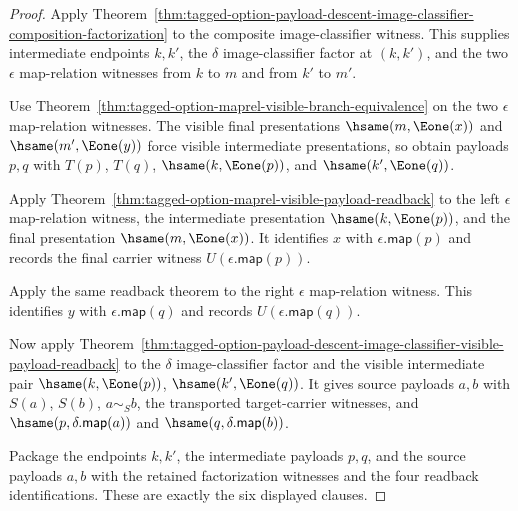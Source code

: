 \begin{proof}
Apply
Theorem~\ref{thm:tagged-option-payload-descent-image-classifier-composition-factorization}
to the composite image-classifier witness. This supplies intermediate endpoints
$k,k'$, the $\delta$ image-classifier factor at $(k,k')$, and the two
$\epsilon$ map-relation witnesses from $k$ to $m$ and from $k'$ to $m'$.

Use Theorem~\ref{thm:tagged-option-maprel-visible-branch-equivalence} on the two
$\epsilon$ map-relation witnesses. The visible final presentations
$\hsame(m,\Eone(x))$ and $\hsame(m',\Eone(y))$ force visible intermediate
presentations, so obtain payloads $p,q$ with $T(p)$, $T(q)$,
$\hsame(k,\Eone(p))$, and $\hsame(k',\Eone(q))$.

Apply Theorem~\ref{thm:tagged-option-maprel-visible-payload-readback} to the left
$\epsilon$ map-relation witness, the intermediate presentation
$\hsame(k,\Eone(p))$, and the final presentation $\hsame(m,\Eone(x))$. It
identifies $x$ with $\epsilon.\mathsf{map}(p)$ and records the final carrier
witness $U(\epsilon.\mathsf{map}(p))$.

Apply the same readback theorem to the right $\epsilon$ map-relation witness.
This identifies $y$ with $\epsilon.\mathsf{map}(q)$ and records
$U(\epsilon.\mathsf{map}(q))$.

Now apply
Theorem~\ref{thm:tagged-option-payload-descent-image-classifier-visible-payload-readback}
to the $\delta$ image-classifier factor and the visible intermediate pair
$\hsame(k,\Eone(p))$, $\hsame(k',\Eone(q))$. It gives source payloads $a,b$ with
$S(a)$, $S(b)$, $a\sim_S b$, the transported target-carrier witnesses, and
$\hsame(p,\delta.\mathsf{map}(a))$ and
$\hsame(q,\delta.\mathsf{map}(b))$.

Package the endpoints $k,k'$, the intermediate payloads $p,q$, and the source
payloads $a,b$ with the retained factorization witnesses and the four readback
identifications. These are exactly the six displayed clauses.
\end{proof}
